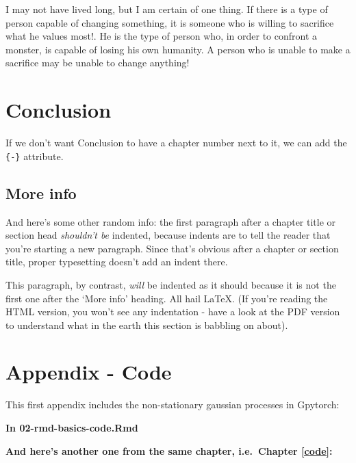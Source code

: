 \documentclass[a4paper, nobind]{templates/cdethesis}
\begin{document}
\begin{savequote}
I may not have lived long, but I am certain of one thing. If there is a
type of person capable of changing something, it is someone who is
willing to sacrifice what he values most!. He is the type of person who,
in order to confront a monster, is capable of losing his own humanity. A
person who is unable to make a sacrifice may be unable to change
anything!
\end{savequote}



\hypertarget{conclusion}{%
\chapter*{Conclusion}\label{conclusion}}

If we don't want Conclusion to have a chapter number next to it, we can add the \texttt{\{-\}} attribute.

\hypertarget{more-info}{%
\section*{More info}\label{more-info}}

And here's some other random info:
the first paragraph after a chapter title or section head \emph{shouldn't be} indented, because indents are to tell the reader that you're starting a new paragraph.
Since that's obvious after a chapter or section title, proper typesetting doesn't add an indent there.

This paragraph, by contrast, \emph{will} be indented as it should because it is not the first one after the `More info' heading.
All hail LaTeX. (If you're reading the HTML version, you won't see any indentation - have a look at the PDF version to understand what in the earth this section is babbling on about).

\startappendices

\hypertarget{appendix---code}{%
\chapter{Appendix - Code}\label{appendix---code}}

This first appendix includes the non-stationary gaussian processes in Gpytorch:

\textbf{In 02-rmd-basics-code.Rmd}

\textbf{And here's another one from the same chapter, i.e.~Chapter \ref{code}:}
\end{document}
